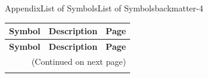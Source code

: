 \documentclass[oneside,10pt,]{book}
\newcommand{\xreffont}{\relax}
\numberwithin{equation}{section}
\providecommand\phantomsection{}
\begin{document}
\begin{appendixptx}{Appendix}{List of Symbols}{}{List of Symbols}{}{}{backmatter-4}
\renewcommand*{\appendixname}{Appendix}
\begin{longtable}[l]{lp{}r}
\addtocounter{table}{-1}
\textbf{Symbol}&\textbf{Description}&\textbf{Page}\\[1em]
\endfirsthead
\textbf{Symbol}&\textbf{Description}&\textbf{Page}\\[1em]
\endhead
\multicolumn{3}{r}{(Continued on next page)}\\
\endfoot
\endlastfoot
\end{longtable}
\end{appendixptx}
%
\backmatter%
%
\clearpage\phantomsection%
%
%
{\xreffont\printindex}
%
%
%
\typeout{************************************************}
\typeout{************************************************}
%
\end{document}
